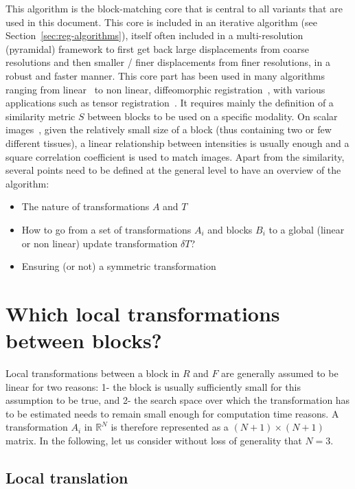 This algorithm is the block-matching core that is central to all variants that are used in this document. This core is included in an iterative algorithm (see Section~\ref{sec:reg-algorithms}), itself often included in a multi-resolution (pyramidal) framework to first get back large displacements from coarse resolutions and then smaller / finer displacements from finer resolutions, in a robust and faster manner. This core part has been used in many algorithms ranging from linear~\cite{Ourselin_Miccai_2000,commowick:inserm-00681610} to non linear, diffeomorphic registration~\cite{Commowick_Miccai_2012}, with various applications such as tensor registration~\cite{suarez:inserm-00657707}. It requires mainly the definition of a similarity metric $S$ between blocks to be used on a specific modality. On scalar images~\cite{Malandain_Neuroimage_2004}, given the relatively small size of a block (thus containing two or few different tissues), a linear relationship between intensities is usually enough and a square correlation coefficient is used to match images. Apart from the similarity, several points need to be defined at the general level to have an overview of the algorithm:

\begin{itemize}
 	\item The nature of transformations $A$ and $T$
 	\item How to go from a set of transformations $A_i$ and blocks $B_i$ to a global (linear or non linear) update transformation $\delta T$?
 	\item Ensuring (or not) a symmetric transformation
 \end{itemize}

\section{Which local transformations between blocks?}
\label{sec:local_trsfs_blocks}

Local transformations between a block in $R$ and $F$ are generally assumed to be linear for two reasons: 1- the block is usually sufficiently small for this assumption to be true, and 2- the search space over which the transformation has to be estimated needs to remain small enough for computation time reasons. A transformation $A_i$ in $\mathbb{R}^N$ is therefore represented as a $(N+1)\times(N+1)$ matrix. In the following, let us consider without loss of generality that $N=3$.

\subsection{Local translation}

